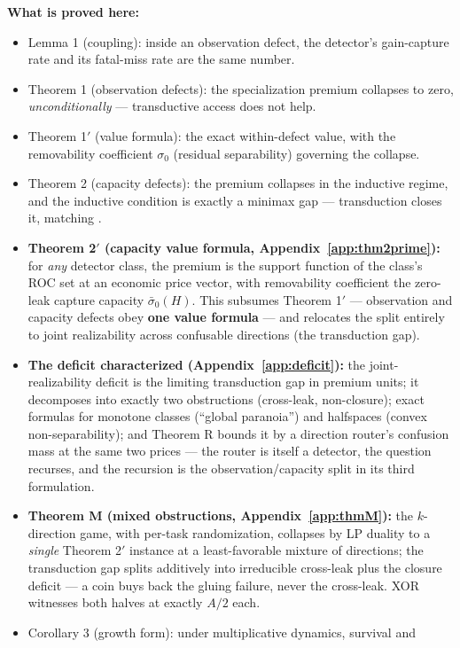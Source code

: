 \documentclass[11pt]{article}
\theoremstyle{plain}
\theoremstyle{definition}
\begin{document}
\textbf{What is proved here:}
\begin{itemize}
\item Lemma 1 (coupling): inside an observation defect, the detector's gain-capture
  rate and its fatal-miss rate are the same number.
\item Theorem 1 (observation defects): the specialization premium collapses to
  zero, \emph{unconditionally} --- transductive access does not help.
\item Theorem 1$'$ (value formula): the exact within-defect value, with the
  removability coefficient $\sigma_0$ (residual separability) governing the collapse.
\item Theorem 2 (capacity defects): the premium collapses in the inductive regime,
  and the inductive condition is exactly a minimax gap --- transduction closes
  it, matching \citet{goldwasser2020}.
\item \textbf{Theorem 2$'$ (capacity value formula, Appendix~\ref{app:thm2prime}):} for \emph{any} detector class, the
  premium is the support function of the class's ROC set at an economic price
  vector, with removability coefficient the zero-leak capture capacity
  $\bar\sigma_0(H)$. This subsumes Theorem 1$'$ --- observation and capacity
  defects obey \textbf{one value formula} --- and relocates the split entirely to
  joint realizability across confusable directions (the transduction gap).
\item \textbf{The deficit characterized (Appendix~\ref{app:deficit}):} the joint-realizability deficit is the
  limiting transduction gap in premium units; it decomposes into exactly two
  obstructions (cross-leak, non-closure); exact formulas for monotone classes
  (``global paranoia'') and halfspaces (convex non-separability); and Theorem R
  bounds it by a direction router's confusion mass at the same two prices ---
  the router is itself a detector, the question recurses, and the recursion
  is the observation/capacity split in its third formulation.
\item \textbf{Theorem M (mixed obstructions, Appendix~\ref{app:thmM}):} the $k$-direction game, with per-task
  randomization, collapses by LP duality to a \emph{single} Theorem 2$'$ instance at
  a least-favorable mixture of directions; the transduction gap splits
  additively into irreducible cross-leak plus the closure deficit --- a coin
  buys back the gluing failure, never the cross-leak. XOR witnesses both
  halves at exactly $A/2$ each.
\item Corollary 3 (growth form): under multiplicative dynamics, survival and

\end{itemize}
\end{document}
